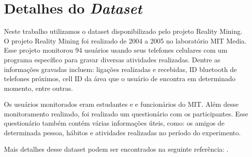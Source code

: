 \section{Detalhes do \textit{Dataset}}\label{modelagem}

Neste trabalho utilizamos o dataset disponibilizado pelo projeto Reality
Mining. O projeto Reality Mining foi realizado de 2004 a 2005 no
laboratório MIT Media. Esse projeto monitorou 94 usuários usando seus
telefones celulares com um programa específico para gravar diversas
atividades realizadas. Dentre as informações gravadas incluem: ligações
realizadas e recebidas, ID bluetooth de telefones próximos, cell ID da
área que o usuário de encontra em determinado momento, entre outras.

Os usuários monitorados eram estudantes e e funcionários do MIT. Além
desse monitoramento realizado, foi realizado um questionário com os
participantes. Esse questionário também contém várias informações úteis,
como: os amigos de determinada pessoa, hábitos e atividades realizadas
no período do experimento. 

Mais detalhes desse dataset podem ser encontrados na seguinte
referência: \cite{eagle2007isn}.
